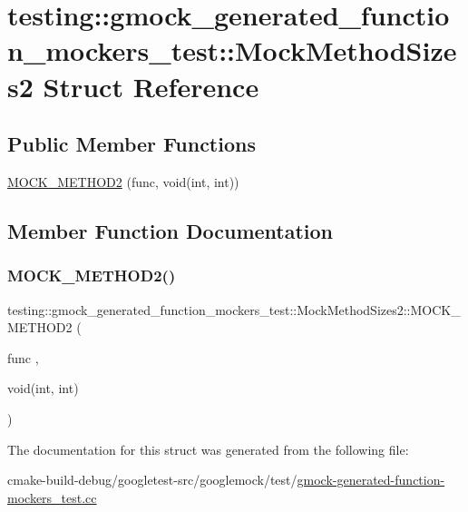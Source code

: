 \hypertarget{structtesting_1_1gmock__generated__function__mockers__test_1_1MockMethodSizes2}{}\section{testing\+::gmock\+\_\+generated\+\_\+function\+\_\+mockers\+\_\+test\+::Mock\+Method\+Sizes2 Struct Reference}
\label{structtesting_1_1gmock__generated__function__mockers__test_1_1MockMethodSizes2}
\subsection*{Public Member Functions}
\begin{DoxyCompactItemize}
\item 
\mbox{\hyperlink{structtesting_1_1gmock__generated__function__mockers__test_1_1MockMethodSizes2_a9200d3c0d5cbabb2bb93da4827b84260}{M\+O\+C\+K\+\_\+\+M\+E\+T\+H\+O\+D2}} (func, void(int, int))
\end{DoxyCompactItemize}


\subsection{Member Function Documentation}
\mbox{\label{structtesting_1_1gmock__generated__function__mockers__test_1_1MockMethodSizes2_a9200d3c0d5cbabb2bb93da4827b84260}} 
\subsubsection{\texorpdfstring{MOCK\_METHOD2()}{MOCK\_METHOD2()}}
{\footnotesize\ttfamily testing\+::gmock\+\_\+generated\+\_\+function\+\_\+mockers\+\_\+test\+::\+Mock\+Method\+Sizes2\+::\+M\+O\+C\+K\+\_\+\+M\+E\+T\+H\+O\+D2 (\begin{DoxyParamCaption}\item[{func}]{,  }\item[{void(int, int)}]{ }\end{DoxyParamCaption})}



The documentation for this struct was generated from the following file\+:\begin{DoxyCompactItemize}
\item 
cmake-\/build-\/debug/googletest-\/src/googlemock/test/\mbox{\hyperlink{gmock-generated-function-mockers__test_8cc}{gmock-\/generated-\/function-\/mockers\+\_\+test.\+cc}}\end{DoxyCompactItemize}

